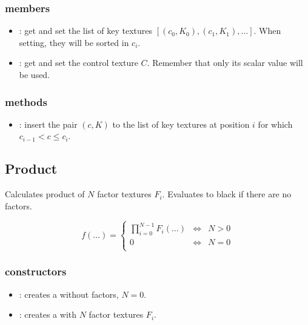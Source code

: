 \subsubsection*{members}
\begin{itemize}
	\item {}:
		get and set the list of key textures $\left[\left(c_0, K_0\right), \left(c_1, K_1\right), \ldots\right]$.  When setting, they will be sorted in $c_i$.
	\item {}:
		get and set the control texture $C$.  Remember that only its scalar value will be used.
\end{itemize}


\subsubsection*{methods}
\begin{itemize}
	\item {}:
		insert the pair $\left(c, K\right)$ to the list of key textures at position $i$ for which $c_{i-1} < c \leq c_i$.
\end{itemize}



\subsection{Product}

Calculates product of $N$ factor textures $F_i$.  Evaluates to black if there are no factors.

\begin{equation}
	f\left(\ldots\right) = \left\{
		\begin{array}{lcl}
			\prod_{i=0}^{N-1} F_i\left(\ldots\right) & \Leftrightarrow & N > 0 \\
			0 & \Leftrightarrow & N = 0 \\
		\end{array}
	\right.
\end{equation}


\subsubsection*{constructors}
\begin{itemize}
	\item {}:
		creates a  without factors, $N=0$.
	\item {}:
		creates a  with $N$ factor textures $F_i$.
\end{itemize}


